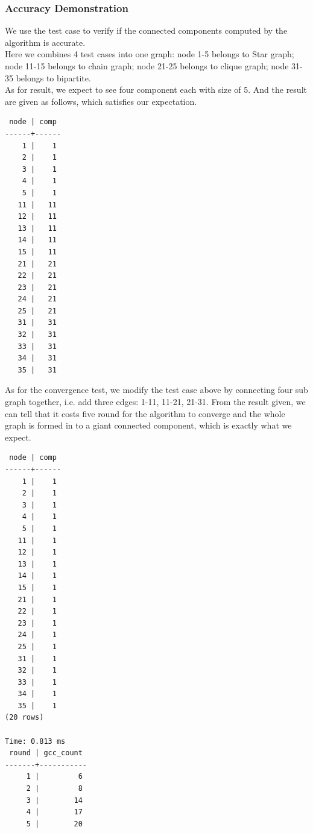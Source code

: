 \subsubsection{Accuracy Demonstration}
We use the test case to verify if the connected components computed by the algorithm is accurate. \\
Here we combines 4 test cases into one graph: node 1-5 belongs to Star graph; node 11-15 belongs to chain graph; node 21-25 belongs to clique graph; node 31-35 belongs to bipartite.\\
As for result, we expect to see four component each with size of 5. And the result are given as follows, which satisfies our expectation.\\
\begin{verbatim}
 node | comp 
------+------
    1 |    1
    2 |    1
    3 |    1
    4 |    1
    5 |    1
   11 |   11
   12 |   11
   13 |   11
   14 |   11
   15 |   11
   21 |   21
   22 |   21
   23 |   21
   24 |   21
   25 |   21
   31 |   31
   32 |   31
   33 |   31
   34 |   31
   35 |   31
\end{verbatim}
As for the convergence test, we modify the test case above by connecting four sub graph together, i.e. add three edges: 1-11, 11-21, 21-31. From the result given, we can tell that it costs five round for the algorithm to converge and the whole graph is formed in to a giant connected component, which is exactly what we expect.

\begin{verbatim}
 node | comp 
------+------
    1 |    1
    2 |    1
    3 |    1
    4 |    1
    5 |    1
   11 |    1
   12 |    1
   13 |    1
   14 |    1
   15 |    1
   21 |    1
   22 |    1
   23 |    1
   24 |    1
   25 |    1
   31 |    1
   32 |    1
   33 |    1
   34 |    1
   35 |    1
(20 rows)

Time: 0.813 ms
 round | gcc_count 
-------+-----------
     1 |         6
     2 |         8
     3 |        14
     4 |        17
     5 |        20
\end{verbatim}

